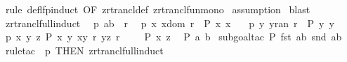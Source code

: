 \begin{isabellebody}
%
\isadelimproof
%
\endisadelimproof
%
\isatagproof
{}\isamarkupfalse%
\ {\isacharparenleft}rule\ def{\isacharunderscore}lfp{\isacharunderscore}induct\ {\isacharbrackleft}OF\ zrtrancl{\isacharunderscore}def\ zrtrancl{\isacharunderscore}fun{\isacharunderscore}mono{\isacharbrackright}{\isacharparenright}\isanewline
{}\isamarkupfalse%
\ {\isacharparenleft}assumption{\isacharparenright}\isanewline
{}\isamarkupfalse%
\ {\isacharparenleft}blast{\isacharparenright}\isanewline
{}\isamarkupfalse%
%
\endisatagproof
{\isafoldproof}%
%
\isadelimproof
\isanewline
%
\endisadelimproof
\isanewline
{}\isamarkupfalse%
\ zrtrancl{\isacharunderscore}full{\isacharunderscore}induct{}{\isacharcolon}\ \isanewline
{}\ p{}{\isacharcolon}\ {\isachardoublequoteopen}{\isacharparenleft}a{\isacharcomma}b{\isacharparenright}\ {\isacharcolon}\ r{\isacharpercent}{\isacharasterisk}{\isachardoublequoteclose}\ \isanewline
{}\ p{}{\isacharcolon}\ {\isachardoublequoteopen}{\isacharbang}{\isacharbang}x{\isachardot}\ x{\isacharcolon}dom\ r\ {\isacharequal}{\isacharequal}{\isachargreater}\ P\ x\ x{\isachardoublequoteclose}\ \ \isanewline
{}\ p{}{\isacharcolon}\ {\isachardoublequoteopen}{\isacharbang}{\isacharbang}y{\isachardot}\ y{\isacharcolon}ran\ r\ {\isacharequal}{\isacharequal}{\isachargreater}\ P\ y\ y{\isachardoublequoteclose}\isanewline
{}\ p{}{\isacharcolon}\ {\isachardoublequoteopen}{\isacharbang}{\isacharbang}x\ y\ z{\isachardot}{\isacharbrackleft}{\isacharbar}\ P\ x\ y{\isacharsemicolon}\ {\isacharparenleft}x{\isacharcomma}y{\isacharparenright}{\isacharcolon}\ r{\isacharpercent}{\isacharasterisk}{\isacharsemicolon}\ {\isacharparenleft}y{\isacharcomma}z{\isacharparenright}{\isacharcolon}\ r\ {\isacharbar}{\isacharbrackright}\ \ {\isacharequal}{\isacharequal}{\isachargreater}\ \ P\ x\ z{\isachardoublequoteclose}\ \isanewline
{}\ {\isachardoublequoteopen}P\ a\ b{\isachardoublequoteclose}\isanewline
%
\isadelimproof
%
\endisadelimproof
%
\isatagproof
{}\isamarkupfalse%
\ {\isacharparenleft}subgoal{\isacharunderscore}tac\ {\isachardoublequoteopen}P\ {\isacharparenleft}fst\ {\isacharparenleft}a{\isacharcomma}b{\isacharparenright}{\isacharparenright}\ {\isacharparenleft}snd\ {\isacharparenleft}a{\isacharcomma}b{\isacharparenright}{\isacharparenright}{\isachardoublequoteclose}{\isacharparenright}\isanewline
{}\isamarkupfalse%
\ {\isacharparenleft}rule{\isacharunderscore}tac\ {\isacharbrackleft}{}{\isacharbrackright}\ p{}\ {\isacharbrackleft}THEN\ zrtrancl{\isacharunderscore}full{\isacharunderscore}induct{\isacharbrackright}{\isacharparenright}\isanewline

\end{isabellebody}

